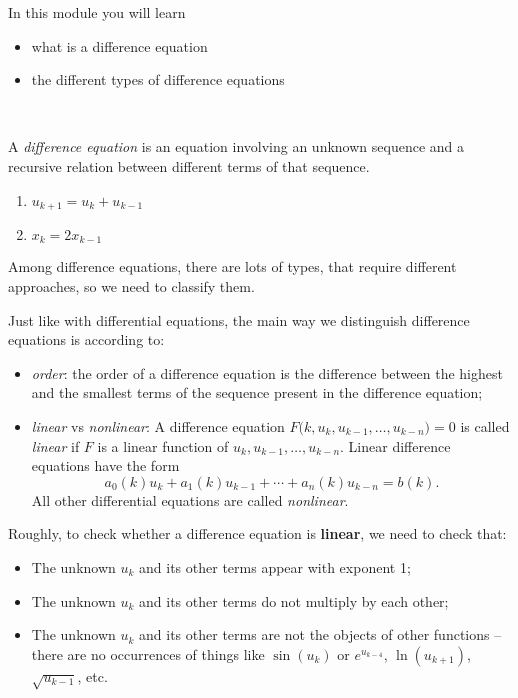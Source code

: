 In this module you will learn
\begin{itemize}
	\item what is a difference equation
	\item the different types of difference equations
\end{itemize}

\hfill \\[-10pt]


\begin{definition}
	A \emph{difference equation} is an equation involving an unknown sequence and a recursive relation between different terms of that sequence.
\end{definition}

\begin{example}
\begin{enumerate}
	\item $u_{k+1} = u_k + u_{k-1}$
	\item $x_k = 2 x_{k-1}$
\end{enumerate}	
\end{example}



Among difference equations, there are lots of types, that require different approaches, so we need to classify them.

\begin{definition}
	Just like with differential equations, the main way we distinguish difference equations is according to:
	\begin{itemize}
		\item \emph{order}: the order of a difference equation is the difference between the highest and the smallest terms of the sequence present in the difference equation;
		\item \emph{linear} vs \emph{nonlinear}: A difference equation \quad $F\big(k,u_k,u_{k-1},\ldots,u_{k-n} \big) = 0$ \quad is called \emph{linear} if $F$ is a linear function of $u_k, u_{k-1}, \ldots,u_{k-n}$. Linear difference equations have the form
			$$ a_0(k) u_k + a_1(k) u_{k-1} + \cdots + a_n(k) u_{k-n} = b(k). $$
			All other differential equations are called \emph{nonlinear}.
	\end{itemize}
\end{definition}

\begin{graybox}
	Roughly, to check whether a difference equation is \textbf{linear}, we need to check that:
	\begin{itemize}
		\item The unknown $u_k$ and its other terms appear with exponent 1;
		\item The unknown $u_k$ and its other terms do not multiply by each other;
		\item The unknown $u_k$ and its other terms are not the objects of other functions -- there are no occurrences of things like $\sin(u_k)$ or $e^{u_{k-4}}$, $\ln(u_{k+1})$, $\sqrt{u_{k-1}}$, etc.
	\end{itemize}
\end{graybox}

